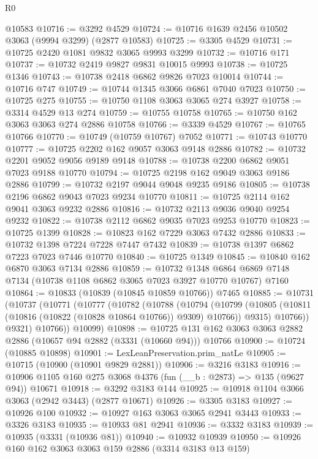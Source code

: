 \begin{lexlean}{R0}
\begin{coremodule}
    @10583
@10716 := @3292 @4529
@10724 := @10716 @1639 @2456 @10502 @3063 (@9994 @3299) (@2877 @10583)
@10725 := @3305 @4529
@10731 := @10725 @2420 @1081 @9832 @3065 @9993 @3299
@10732 := @10716 @171
@10737 := @10732 @2419 @9827 @9831 @10015 @9993
@10738 := @10725 @1346
@10743 := @10738 @2418 @6862 @9826 @7023 @10014
@10744 := @10716 @747
@10749 := @10744 @1345 @3066 @6861 @7040 @7023
@10750 := @10725 @275
@10755 := @10750 @1108 @3063 @3065 @274 @3927
@10758 := @3314 @4529 @13 @274
@10759 := @10755 @10758
@10765 := @10750 @162 @3063 @3063 @274 @2886 @10758
@10766 := @3339 @4529
@10767 := @10765 @10766
@10770 := @10749 (@10759 @10767) @7052
@10771 := @10743 @10770
@10777 := @10725 @2202 @162 @9057 @3063 @9148 @2886
@10782 := @10732 @2201 @9052 @9056 @9189 @9148
@10788 := @10738 @2200 @6862 @9051 @7023 @9188 @10770
@10794 := @10725 @2198 @162 @9049 @3063 @9186 @2886
@10799 := @10732 @2197 @9044 @9048 @9235 @9186
@10805 := @10738 @2196 @6862 @9043 @7023 @9234 @10770
@10811 := @10725 @2114 @162 @9041 @3063 @9232 @2886
@10816 := @10732 @2113 @9036 @9040 @9254 @9232
@10822 := @10738 @2112 @6862 @9035 @7023 @9253 @10770
@10823 := @10725 @1399
@10828 := @10823 @162 @7229 @3063 @7432 @2886
@10833 := @10732 @1398 @7224 @7228 @7447 @7432
@10839 := @10738 @1397 @6862 @7223 @7023 @7446 @10770
@10840 := @10725 @1349
@10845 := @10840 @162 @6870 @3063 @7134 @2886
@10859 := @10732
    @1348
    @6864
    @6869
    @7148
    @7134
    (@10738 @1108 @6862 @3065 @7023 @3927 @10770 @10767)
    @7160
@10864 := @10833 (@10839 (@10845 @10859 @10766)) @7465
@10885 := @10731
    (@10737
      (@10771
        (@10777
          (@10782
            (@10788
              (@10794
                (@10799
                  (@10805 (@10811 (@10816 (@10822 (@10828 @10864 @10766)) @9309) @10766))
                  @9315)
                @10766))
            @9321)
          @10766))
      @10099)
@10898 := @10725 @131 @162 @3063 @3063 @2882 @2886 (@10657 @94 @2882 (@3331 (@10660 @94))) @10766
@10900 := @10724 (@10885 @10898)
@10901 := LexLeanPreservation.prim_natLe
@10905 := @10715 (@10900 (@10901 @9829 @2881))
@10906 := @3216 @3183
@10916 := @10906 @1105 @160 @275 @3068 @4376 (fun (__b : @2873) => @135 (@9627 @94)) @10671
@10918 := @3292 @3183 @144
@10925 := @10918 @1104 @3066 @3063 (@2942 @3443) (@2877 @10671)
@10926 := @3305 @3183
@10927 := @10926 @100
@10932 := @10927 @163 @3063 @3065 @2941 @3443
@10933 := @3326 @3183
@10935 := @10933 @81 @2941
@10936 := @3332 @3183
@10939 := @10935 (@3331 (@10936 @81))
@10940 := @10932 @10939
@10950 := @10926 @160 @162 @3063 @3063 @159 @2886 (@3314 @3183 @13 @159)

\end{coremodule}
\end{lexlean}
